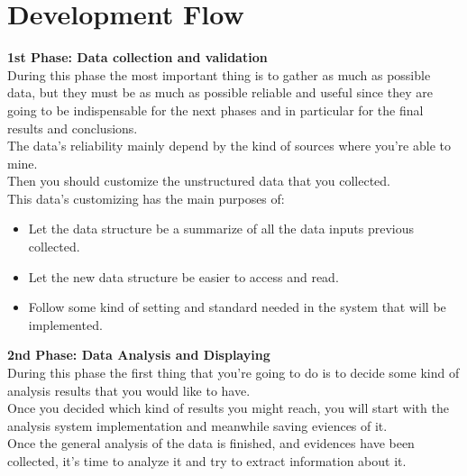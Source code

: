 
\hypersetup{
    colorlinks=true,
    linkcolor=blue,
    filecolor=magenta,      
    urlcolor=blue,
}


\section{Development Flow}

\textbf{1st Phase: Data collection and validation}\\
During this phase the most important thing is to gather as much as possible data, but they must be as much as possible reliable and useful since they are going to be indispensable for the next phases and in particular for the final results and conclusions.\\
The data’s reliability mainly depend by the kind of sources where you’re able to mine.\\
Then you should customize the unstructured data that you collected.\\
This data’s customizing has the main purposes of:
\vspace{-5mm}
\begin{itemize}
 \setlength{\itemsep}{-5pt}
 \item Let the data structure be a summarize of all the data inputs previous collected.
 \item Let the new data structure be easier to access and read.
 \item Follow some kind of setting and standard needed in the system that will be implemented.
\end{itemize}


\textbf{2nd Phase: Data Analysis and Displaying}\\
During this phase the first thing that you’re going to do is to decide some kind of analysis results that you would like to have.\\
Once you decided which kind of results you might reach, you will start with the analysis system implementation and meanwhile saving eviences of it.\\
Once the general analysis of the data is finished, and evidences have been collected, it's time to analyze it and try to extract information about it.

